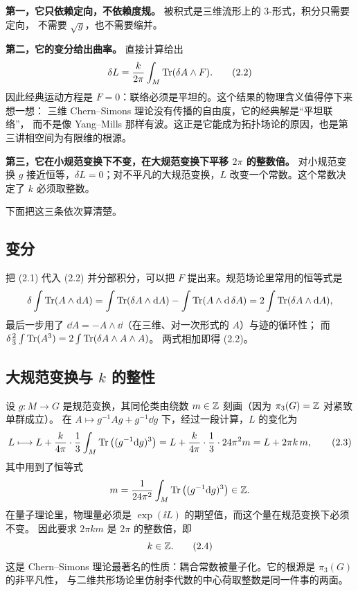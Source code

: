\textbf{第一，它只依赖定向，不依赖度规。} 被积式是三维流形上的 $3$-形式，积分只需要定向，
不需要 $\sqrt g$，也不需要缩并。

\textbf{第二，它的变分给出曲率。} 直接计算给出
\begin{equation}
\delta L=\frac{k}{2\pi}\int_M\operatorname{Tr}(\delta A\wedge F). \tag{2.2}
\end{equation}
因此经典运动方程是 $F=0$：联络必须是平坦的。这个结果的物理含义值得停下来想一想：
三维 Chern--Simons 理论没有传播的自由度，它的经典解是“平坦联络”，
而不是像 Yang--Mills 那样有波。这正是它能成为拓扑场论的原因，也是第三讲相空间为有限维的根源。

\textbf{第三，它在小规范变换下不变，在大规范变换下平移 $2\pi$ 的整数倍。} 对小规范变换
$g$ 接近恒等，$\delta L=0$；对不平凡的大规范变换，$L$ 改变一个常数。这个常数决定了 $k$ 必须取整数。

下面把这三条依次算清楚。

\subsection{变分}

把 (2.1) 代入 (2.2) 并分部积分，可以把 $F$ 提出来。规范场论里常用的恒等式是
\[
\delta\int\operatorname{Tr}(A\wedge\mathrm{d} A)=\int\operatorname{Tr}(\delta A\wedge\mathrm{d} A)-\int\operatorname{Tr}(A\wedge\mathrm{d}\,\delta A)
=2\int\operatorname{Tr}(\delta A\wedge\mathrm{d} A),
\]
最后一步用了 $\dd A=-A\wedge\dd$（在三维、对一次形式的 $A$）与迹的循环性；
而 $\delta\frac23\int\operatorname{Tr}(A^3)=2\int\operatorname{Tr}(\delta A\wedge A\wedge A)$。
两式相加即得 (2.2)。

\subsection{大规范变换与 $k$ 的整性}

设 $g:M\to G$ 是规范变换，其同伦类由绕数 $m\in\mathbb{Z}$ 刻画（因为 $\pi_3(G)=\mathbb{Z}$ 对紧致单群成立）。
在 $A\mapsto g^{-1}Ag+g^{-1}\dd g$ 下，经过一段计算，$L$ 的变化为
\begin{equation}
L\longmapsto L+\frac{k}{4\pi}\cdot\frac13\int_M\operatorname{Tr}\left((g^{-1}\mathrm{d} g)^3\right)
=L+\frac{k}{4\pi}\cdot\frac13\cdot 24\pi^2m
=L+2\pi k\,m, \tag{2.3}
\end{equation}
其中用到了恒等式
\[
m=\frac{1}{24\pi^2}\int_M\operatorname{Tr}\left((g^{-1}\mathrm{d} g)^3\right)\in\mathbb{Z}.
\]
在量子理论里，物理量必须是 $\exp(\ii L)$ 的期望值，而这个量在规范变换下必须不变。
因此要求 $2\pi k m$ 是 $2\pi$ 的整数倍，即
\begin{equation}
k\in\mathbb{Z}. \tag{2.4}
\end{equation}
这是 Chern--Simons 理论最著名的性质：耦合常数被量子化。它的根源是 $\pi_3(G)$ 的非平凡性，
与二维共形场论里仿射李代数的中心荷取整数是同一件事的两面。

